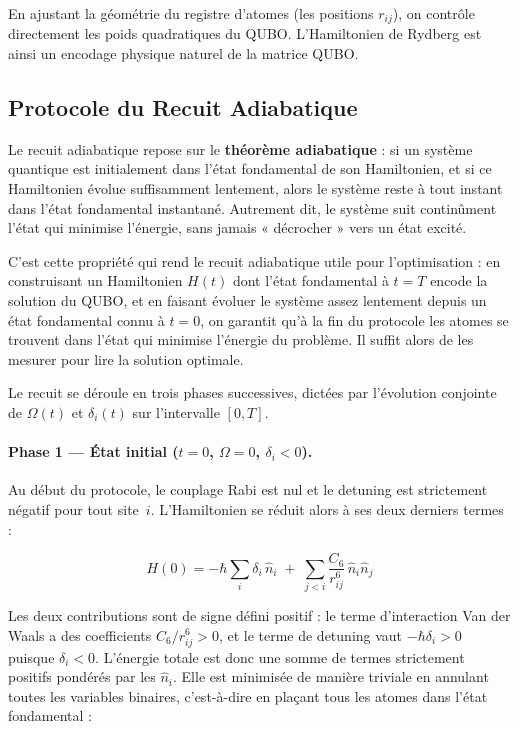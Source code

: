 \documentclass{ceri/sty/rapport}
\begin{document}
En ajustant la géométrie du registre d'atomes (les positions $r_{ij}$), on contrôle directement
les poids quadratiques du QUBO. L'Hamiltonien de Rydberg est ainsi un encodage physique naturel
de la matrice QUBO.

\subsection{Protocole du Recuit Adiabatique}
\label{sec:recuit}

Le recuit adiabatique repose sur le \textbf{théorème adiabatique} : si un système quantique
est initialement dans l'état fondamental de son Hamiltonien, et si ce Hamiltonien évolue
suffisamment lentement, alors le système reste à tout instant dans l'état fondamental instantané.
Autrement dit, le système suit continûment l'état qui minimise l'énergie, sans jamais « décrocher »
vers un état excité.

C'est cette propriété qui rend le recuit adiabatique utile pour l'optimisation : en construisant
un Hamiltonien $H(t)$ dont l'état fondamental à $t = T$ encode la solution du QUBO, et en faisant
évoluer le système assez lentement depuis un état fondamental connu à $t = 0$, on garantit qu'à
la fin du protocole les atomes se trouvent dans l'état qui minimise l'énergie du problème. Il
suffit alors de les mesurer pour lire la solution optimale.

Le recuit se déroule en trois phases successives, dictées par l'évolution conjointe de
$\Omega(t)$ et $\delta_i(t)$ sur l'intervalle $[0, T]$.

\paragraph{Phase 1 --- État initial ($t = 0$, $\Omega = 0$, $\delta_i < 0$).}

Au début du protocole, le couplage Rabi est nul et le detuning est strictement négatif pour tout
site~$i$. L'Hamiltonien se réduit alors à ses deux derniers termes :

\begin{equation}
H(0) = -\hbar \sum_i \delta_i\,\hat{n}_i \;+\; \sum_{j<i} \frac{C_6}{r_{ij}^6}\,\hat{n}_i \hat{n}_j
\end{equation}

Les deux contributions sont de signe défini positif : le terme d'interaction Van der Waals a des
coefficients $C_6/r_{ij}^6 > 0$, et le terme de detuning vaut $-\hbar\delta_i > 0$ puisque
$\delta_i < 0$. L'énergie totale est donc une somme de termes strictement positifs pondérés par
les $\hat{n}_i$. Elle est minimisée de manière triviale en annulant toutes les variables
binaires, c'est-à-dire en plaçant tous les atomes dans l'état fondamental :
\end{document}
